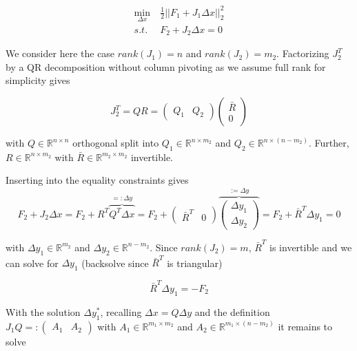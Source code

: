 \documentclass{scrartcl}[12pt, halfparskip]
\numberwithin{equation}{section}
\numberwithin{figure}{section}
\numberwithin{table}{section}
\begin{document}
\begin{align}
	\min_{\Delta x} & \ \frac{1}{2} || F_1 + J_1 \Delta x ||_2^2 \label{eq:numerical_soln_eq_constrained_LSQ} \\
	s.t. & \ F_2 + J_2 \Delta x = 0 \nonumber
\end{align}

We consider here the case $rank(J_1) = n$ and $rank(J_2)=m_2$. Factorizing $J_2^T$ by a QR decomposition without column pivoting as we assume full rank for simplicity gives

\begin{equation}
	J_2^T = Q R = 
	\begin{pmatrix}
		Q_1 & Q_2
	\end{pmatrix}
	\begin{pmatrix}
		\bar{R} \\
		0
	\end{pmatrix}
\end{equation}

with $Q \in \mathbb{R}^{n \times n}$ orthogonal split into $Q_1 \in \mathbb{R}^{n \times m_2}$ and $Q_2 \in \mathbb{R}^{n \times (n-m_2)}$. Further, $R \in \mathbb{R}^{n \times m_2}$ with $\bar{R} \in \mathbb{R}^{m_2 \times m_2}$ invertible.

Inserting into the equality constraints gives
\begin{equation}
	F_2 + J_2 \Delta x = F_2 + R^T \overbrace{Q^T \Delta x}^{=: \Delta y} = F_2 +
	\begin{pmatrix}
		\bar{R}^T & 0
	\end{pmatrix} 
	\overbrace{
	\begin{pmatrix}
		\Delta y_1 \\
		\Delta y_2
	\end{pmatrix}}^{:= \Delta y} = F_2 + \bar{R}^T \Delta y_1 = 0
\end{equation}

with $\Delta y_1 \in \mathbb{R}^{m_2}$ and $\Delta y_2 \in \mathbb{R}^{n-m_2}$. Since $rank(J_2)=m$, $\bar{R}^T$ is invertible and we can solve for $\Delta y_1$ (backsolve since $\bar{R}^T$ is triangular)

\begin{equation}
	\bar{R}^T \Delta y_1 = -F_2
\end{equation}

With the solution $\Delta y_1^*$, recalling $\Delta x = Q \Delta y$ and the definition $J_1 Q =: \begin{pmatrix} A_1 & A_2 \end{pmatrix}$ with $A_1 \in \mathbb{R}^{m_1 \times m_2}$ and $A_2 \in \mathbb{R}^{m_1 \times (n-m_2)}$ it remains to solve
\end{document}
